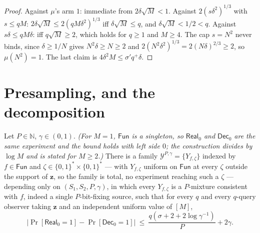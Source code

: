 \documentclass{aicr-solution}
\newcommand{\Fun}{\mathsf{Fun}}
\newcommand{\Real}{\mathsf{Real}}
\newcommand{\Dec}{\mathsf{Dec}}
\newcommand{\Prob}[1]{\Pr\!\left[#1\right]}
\newcommand{\bits}{\{0,1\}}
\newcommand{\vz}{\mathbf{z}}
\begin{document}
\begin{proof}
Against $\mu$'s arm $1$: immediate from $2\delta\sqrt M<1$. Against
$2(s\delta^{2})^{1/3}$ with $s\le qM$: $2\delta\sqrt M\le2(qM\delta^{2})^{1/3}$ iff
$\delta\sqrt M\le q$, and $\delta\sqrt M<1/2<q$. Against $s\delta\le qM\delta$: iff
$q\sqrt M\ge2$, which holds for $q\ge1$ and $M\ge4$. The cap $s=N^{2}$ never binds,
since $\delta\ge1/N$ gives $N^{2}\delta\ge N\ge2$ and
$2(N^{2}\delta^{2})^{1/3}=2(N\delta)^{2/3}\ge2$, so $\mu(N^{2})=1$. The last claim
is $4\delta^{2}M\le\sigma'q^{+}\delta$.
\end{proof}

\section{Presampling, and the decomposition}

\begin{lemma}\label{lem:P}
Let $P\in\mathbb N$, $\gamma\in(0,1)$. \emph{(For $M=1$, $\Fun$ is a singleton,
so $\Real_0$ and $\Dec_0$ are the same experiment and the bound holds with left
side $0$; the construction divides by $\log M$ and is stated for $M\ge2$.)} There
is a family $\mathcal Y^{P,\gamma}=\{Y_{f,\zeta}\}$ indexed by $f\in\Fun$ and
$\zeta\in\bits^{*}\times\bits^{*}$ --- with $Y_{f,\zeta}$ uniform on $\Fun$ at
every $\zeta$ outside the support of $\vz$, so the family is total, no experiment
reaching such a $\zeta$ --- depending only on $(S_1,S_2,P,\gamma)$, in which every
$Y_{f,\zeta}$ is a $P$-mixture consistent with $f$, indeed a single
$P$-bit-fixing source, such that for every $q$ and every $q$-query observer
taking $\vz$ and an independent uniform value of $[M]$,
\[
  \bigl|\Prob{\Real_0=1}-\Prob{\Dec_0=1}\bigr|\ \le\
  \frac{q(\sigma+2+2\log\gamma^{-1})}{P}+2\gamma .
\]
\end{lemma}
\end{document}
